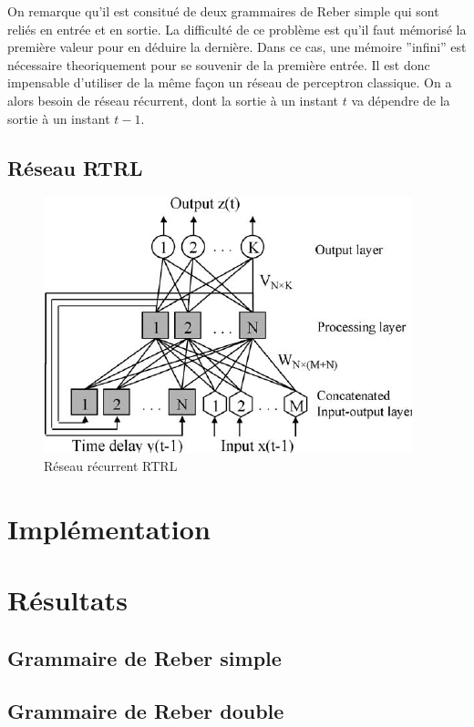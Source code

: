 On remarque qu'il est consitué de deux grammaires de Reber simple qui sont
reliés en entrée et en sortie. La difficulté de ce problème est qu'il faut
mémorisé la première valeur pour en déduire la dernière. Dans ce cas, une
mémoire ''infini'' est nécessaire theoriquement pour se souvenir de la première
entrée. Il est donc impensable d'utiliser de la même façon un réseau de
perceptron classique. On a alors besoin de réseau récurrent, dont la sortie à un
 instant $t$ va dépendre de la sortie à un instant $t-1$.

\subsection{Réseau RTRL}

\begin{figure}[!ht]
\begin{center}
\includegraphics[scale=0.8]{images/rtrl.png}
\end{center}
\caption{Réseau récurrent RTRL}
\end{figure}

\section{Implémentation}

\section{Résultats}
\subsection{Grammaire de Reber simple}
\subsection{Grammaire de Reber double}
